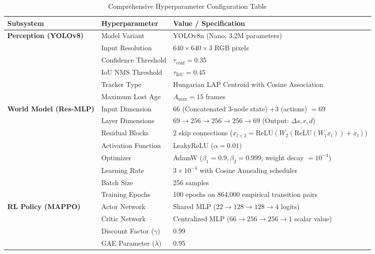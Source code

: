 \documentclass[12pt,a4paper,oneside]{report}
\begin{document}
\begin{table}[htbp]
\centering
\small
\caption{Comprehensive Hyperparameter Configuration Table}
\label{tab:all_hyperparams}
\begin{tabularx}{\textwidth}{|p{3.5cm}|p{4.2cm}|X|}
\hline
\textbf{Subsystem} & \textbf{Hyperparameter} & \textbf{Value / Specification} \\ \hline
\textbf{Perception (YOLOv8)} & Model Variant & YOLOv8n (Nano, 3.2M parameters) \\ \cline{2-3}
& Input Resolution & $640 \times 640 \times 3$ RGB pixels \\ \cline{2-3}
& Confidence Threshold & $\tau_{\text{conf}} = 0.35$ \\ \cline{2-3}
& IoU NMS Threshold & $\tau_{\text{IoU}} = 0.45$ \\ \cline{2-3}
& Tracker Type & Hungarian LAP Centroid with Cosine Association \\ \cline{2-3}
& Maximum Lost Age & $A_{\max} = 15$ frames \\ \hline
\textbf{World Model (Res-MLP)} & Input Dimension & $66$ (Concatenated 3-node state) $+ 3$ (actions) $= 69$ \\ \cline{2-3}
& Layer Dimensions & $69 \rightarrow 256 \rightarrow 256 \rightarrow 256 \rightarrow 69$ (Output: $\Delta s, r, d$) \\ \cline{2-3}
& Residual Blocks & 2 skip connections ($x_{l+2} = \text{ReLU}(W_2(\text{ReLU}(W_1 x_l)) + x_l)$) \\ \cline{2-3}
& Activation Function & LeakyReLU ($\alpha = 0.01$) \\ \cline{2-3}
& Optimizer & AdamW ($\beta_1 = 0.9, \beta_2 = 0.999$, weight decay $= 10^{-4}$) \\ \cline{2-3}
& Learning Rate & $3 \times 10^{-4}$ with Cosine Annealing scheduler \\ \cline{2-3}
& Batch Size & 256 samples \\ \cline{2-3}
& Training Epochs & 100 epochs on 864,000 empirical transition pairs \\ \hline
\textbf{RL Policy (MAPPO)} & Actor Network & Shared MLP ($22 \rightarrow 128 \rightarrow 128 \rightarrow 4$ logits) \\ \cline{2-3}
& Critic Network & Centralized MLP ($66 \rightarrow 256 \rightarrow 256 \rightarrow 1$ scalar value) \\ \cline{2-3}
& Discount Factor ($\gamma$) & 0.99 \\ \cline{2-3}
& GAE Parameter ($\lambda$) & 0.95 \\ \cline{2-3}

\end{tabularx}
\end{table}
\end{document}
